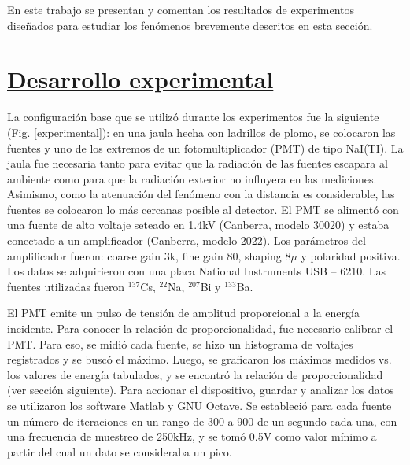 \documentclass[twoside]{article}
\begin{document}
\begin{multicols}{2}
En este trabajo se presentan y comentan los resultados de experimentos diseñados para estudiar los fenómenos brevemente descritos en esta sección.


\section*{\underline{Desarrollo experimental}}

La configuración base que se utilizó durante los experimentos fue la siguiente (Fig. \ref{experimental}): en una jaula hecha con ladrillos de plomo, se colocaron las fuentes y uno de los extremos de un fotomultiplicador (PMT) de tipo NaI(TI). La jaula fue necesaria tanto para evitar que la radiación de las fuentes escapara al ambiente como para que la radiación exterior no influyera en las mediciones. Asimismo, como la atenuación del fenómeno con la distancia es considerable, las fuentes se colocaron lo más cercanas posible al detector. El PMT se alimentó con una fuente de alto voltaje seteado en 1.4kV (Canberra, modelo 30020) y estaba conectado a un amplificador (Canberra, modelo 2022). Los parámetros del amplificador fueron: coarse gain 3k, fine gain 80, shaping 8$\mu$ y polaridad positiva. Los datos se adquirieron con una placa National Instruments USB -- 6210. Las fuentes utilizadas fueron $^{137}$Cs, $^{22}$Na, $^{207}$Bi y $^{133}$Ba. 

El PMT emite un pulso de tensión de amplitud proporcional a la energía incidente. Para conocer la relación de proporcionalidad, fue necesario calibrar el PMT. Para eso, se midió cada fuente, se hizo un histograma de voltajes registrados y se buscó el máximo. Luego, se graficaron los máximos medidos vs. los valores de energía tabulados, y se encontró la relación de proporcionalidad (ver sección siguiente). Para accionar el dispositivo, guardar y analizar los datos se utilizaron los software Matlab y GNU Octave. Se estableció para cada fuente un número de iteraciones en un rango de 300 a 900 de un segundo cada una, con una frecuencia de muestreo de 250kHz, y se tomó 0.5V como valor mínimo a partir del cual un dato se consideraba un pico. 


\end{multicols}
\end{document}
